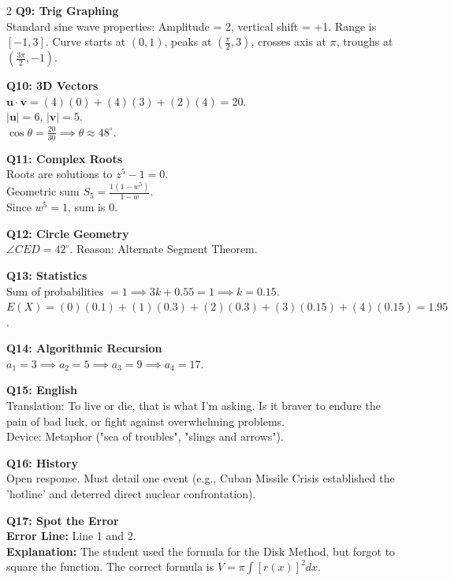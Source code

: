 \documentclass[11pt, a4paper]{article}
\begin{document}
\begin{multicols}{2}
\textbf{Q9: Trig Graphing} \\
Standard sine wave properties: Amplitude = 2, vertical shift = +1. Range is $[-1, 3]$. Curve starts at $(0,1)$, peaks at $(\frac{\pi}{2}, 3)$, crosses axis at $\pi$, troughs at $(\frac{3\pi}{2}, -1)$.

\textbf{Q10: 3D Vectors} \\
$\mathbf{u} \cdot \mathbf{v} = (4)(0) + (4)(3) + (2)(4) = 20$. \\
$|\mathbf{u}| = 6$, $|\mathbf{v}| = 5$. \\
$\cos\theta = \frac{20}{30} \implies \theta \approx 48^\circ$.

\textbf{Q11: Complex Roots} \\
Roots are solutions to $z^5 - 1 = 0$. \\
Geometric sum $S_5 = \frac{1(1-w^5)}{1-w}$. \\
Since $w^5 = 1$, sum is 0.

\columnbreak

\textbf{Q12: Circle Geometry} \\
$\angle CED = 42^\circ$. Reason: Alternate Segment Theorem.

\textbf{Q13: Statistics} \\
Sum of probabilities $= 1 \implies 3k + 0.55 = 1 \implies k = 0.15$. \\
$E(X) = (0)(0.1) + (1)(0.3) + (2)(0.3) + (3)(0.15) + (4)(0.15) = 1.95$.

\textbf{Q14: Algorithmic Recursion} \\
$a_1 = 3 \implies a_2 = 5 \implies a_3 = 9 \implies a_4 = 17$.

\textbf{Q15: English} \\
Translation: To live or die, that is what I'm asking. Is it braver to endure the pain of bad luck, or fight against overwhelming problems. \\
Device: Metaphor ("sea of troubles", "slings and arrows").

\textbf{Q16: History} \\
Open response. Must detail one event (e.g., Cuban Missile Crisis established the 'hotline' and deterred direct nuclear confrontation).

\textbf{Q17: Spot the Error} \\
\textbf{Error Line:} Line 1 and 2. \\
\textbf{Explanation:} The student used the formula for the Disk Method, but forgot to square the function. The correct formula is $V = \pi \int [r(x)]^2 dx$.


\end{multicols}
\end{document}

